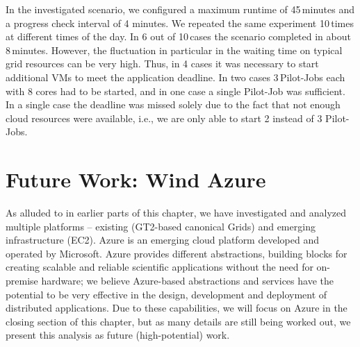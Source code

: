\documentclass[graybox]{svmult}
\begin{document}

In the investigated scenario, we configured a maximum runtime of
45\,minutes and a progress check interval of 4 minutes. We repeated
the same experiment 10\,times at different times of the day. In 6 out
of 10\,cases the scenario completed in about 8\,minutes. However, the
fluctuation in particular in the waiting time on typical grid
resources can be very high. Thus, in 4 cases it was necessary to start
additional VMs to meet the application deadline.  In two cases
3\,Pilot-Jobs each with 8 cores had to be started, and in one case a
single Pilot-Job was sufficient.  In a single case the deadline was
missed solely due to the fact that not enough cloud resources were
available, i.e., we are only able to start 2 instead of 3
Pilot-Jobs.

\section{Future Work: Wind Azure}

 

As alluded to in earlier parts of this chapter, we have investigated
and analyzed multiple platforms -- existing (GT2-based canonical
Grids) and emerging infrastructure (EC2). Azure is an emerging cloud
platform developed and operated by Microsoft.  Azure provides
different abstractions, building blocks for creating scalable and
reliable scientific applications without the need for on-premise
hardware; we believe Azure-based abstractions and services have the
potential to be very effective in the design, development and
deployment of distributed applications. Due to these capabilities, we
will focus on Azure in the closing section of this chapter, but as
many details are still being worked out, we present this analysis as
future (high-potential) work.
\end{document}
